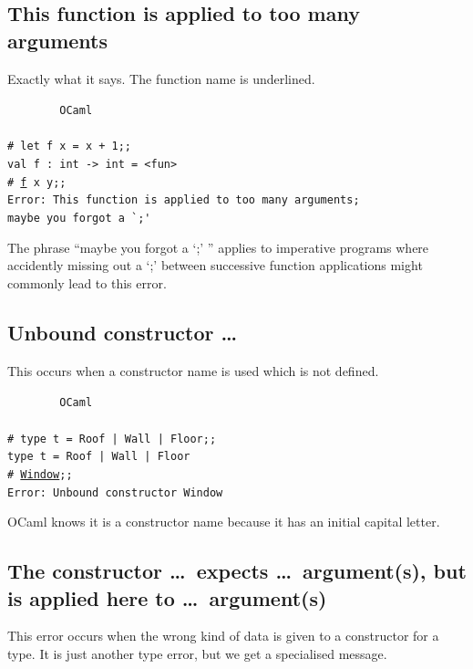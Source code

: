 \documentclass[]{book}
\newcommand{\smspace}{\vspace{4mm}}
\begin{document}
\subsection*{This function is applied to too many arguments}

Exactly what it says. The function name is underlined. 

\smspace
\noindent\verb!        OCaml!\\
\noindent\\
\texttt{\# let f x = x + 1;;}\\
\texttt{val f :\ int -> int = <fun>}\\
\texttt{\# }\underline{\verb!f!}\texttt{ x y;;}\\
\texttt{Error:\ This function is applied to too many arguments;}\\
\texttt{maybe you forgot a }\verb!`;'!
\smspace

\noindent The phrase ``maybe you forgot a `;' '' applies to imperative programs where accidently missing out a `;' between successive function applications might commonly lead to this error.

\subsection*{Unbound constructor \ldots}

This occurs when a constructor name is used which is not defined.

\smspace
\noindent\verb!        OCaml!\\
\noindent\\
\texttt{\# type t = Roof | Wall | Floor;;}\\
\texttt{type t = Roof | Wall | Floor}\\
\texttt{\# }\underline{\verb!Window!}\texttt{;;}\\
\texttt{Error:\ Unbound constructor Window}
\smspace

\noindent OCaml knows it is a constructor name because it has an initial capital letter.

\subsection*{The constructor \ldots\ expects \ldots\ argument(s), but is applied here to \ldots\ argument(s)}

This error occurs when the wrong kind of data is given to a constructor for a type. It is just another type error, but we get a specialised message.
\end{document}
